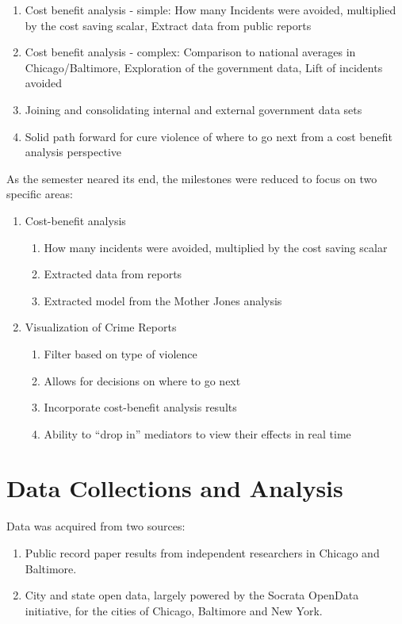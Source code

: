 \documentclass[11pt,preprint]{aastex}
\begin{document}
\begin{enumerate}
\item Cost benefit analysis - simple:
How many Incidents were avoided, multiplied by the cost saving scalar,
Extract data from public reports
\item Cost benefit analysis - complex:
Comparison to national averages in Chicago/Baltimore,
Exploration of the government data,
Lift of incidents avoided
\item Joining and consolidating internal and external government data sets
\item Solid path forward for cure violence of where to go next from a cost benefit analysis perspective
\end{enumerate}

As the semester neared its end, the milestones were reduced to focus on two specific areas:
\begin{enumerate}
    \item Cost-benefit analysis
    \begin{enumerate}
        \item How many incidents were avoided, multiplied by the cost saving scalar
        \item Extracted data from reports
        \item Extracted model from the Mother Jones analysis
    \end{enumerate}
    \item Visualization of Crime Reports
    \begin{enumerate}
        \item Filter based on type of violence
        \item Allows for decisions on where to go next
        \item Incorporate cost-benefit analysis results
        \item Ability to “drop in” mediators to view their effects in real time
    \end{enumerate}
\end{enumerate}

\section{Data Collections and Analysis}
Data was acquired from two sources:
\begin{enumerate}
    \item Public record paper results from independent researchers in Chicago and Baltimore. 
    \item City and state open data, largely powered by the Socrata OpenData initiative, for the cities of Chicago, Baltimore and New York.
\end{enumerate}
\end{document}
